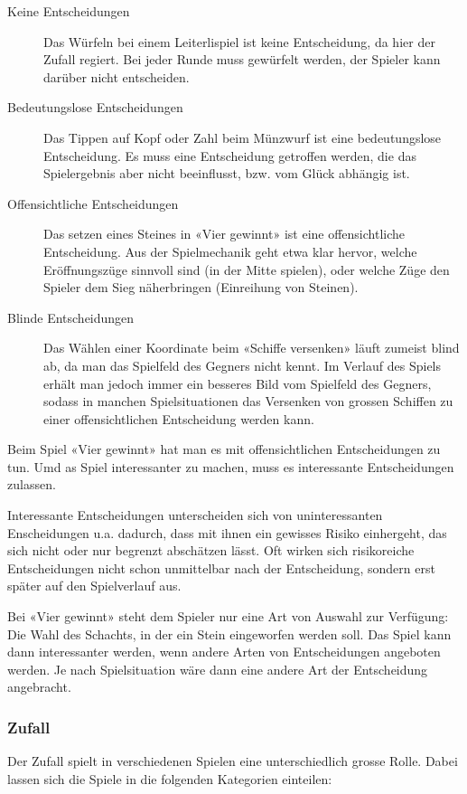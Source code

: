 \documentclass[a4paper,11pt,hidelinks]{scrartcl}
\begin{document}
\begin{description}
    \item[Keine Entscheidungen] Das Würfeln bei einem Leiterlispiel ist keine Entscheidung, da hier der Zufall regiert. Bei jeder Runde muss gewürfelt werden, der Spieler kann darüber nicht entscheiden.
    \item[Bedeutungslose Entscheidungen] Das Tippen auf Kopf oder Zahl beim Münzwurf ist eine bedeutungslose Entscheidung. Es muss eine Entscheidung getroffen werden, die das Spielergebnis aber nicht beeinflusst, bzw. vom Glück abhängig ist.
    \item[Offensichtliche Entscheidungen] Das setzen eines Steines in «Vier gewinnt» ist eine offensichtliche Entscheidung. Aus der Spielmechanik geht etwa klar hervor, welche Eröffnungszüge sinnvoll sind (in der Mitte spielen), oder welche Züge den Spieler dem Sieg näherbringen (Einreihung von Steinen).
    \item[Blinde Entscheidungen] Das Wählen einer Koordinate beim «Schiffe versenken» läuft zumeist blind ab, da man das Spielfeld des Gegners nicht kennt. Im Verlauf des Spiels erhält man jedoch immer ein besseres Bild vom Spielfeld des Gegners, sodass in manchen Spielsituationen das Versenken von grossen Schiffen zu einer offensichtlichen Entscheidung werden kann.
\end{description}

Beim Spiel «Vier gewinnt» hat man es mit offensichtlichen Entscheidungen zu tun. Umd as Spiel interessanter zu machen, muss es interessante Entscheidungen zulassen.

Interessante Entscheidungen unterscheiden sich von uninteressanten Enscheidungen u.a. dadurch, dass mit ihnen ein gewisses Risiko einhergeht, das sich nicht oder nur begrenzt abschätzen lässt. Oft wirken sich risikoreiche Entscheidungen nicht schon unmittelbar nach der Entscheidung, sondern erst später auf den Spielverlauf aus.

Bei «Vier gewinnt» steht dem Spieler nur eine Art von Auswahl zur Verfügung: Die Wahl des Schachts, in der ein Stein eingeworfen werden soll. Das Spiel kann dann interessanter werden, wenn andere Arten von Entscheidungen angeboten werden. Je nach Spielsituation wäre dann eine andere Art der Entscheidung angebracht.

\subsubsection{Zufall}

Der Zufall spielt in verschiedenen Spielen eine unterschiedlich grosse Rolle. Dabei lassen sich die Spiele in die folgenden Kategorien einteilen:
\end{document}
